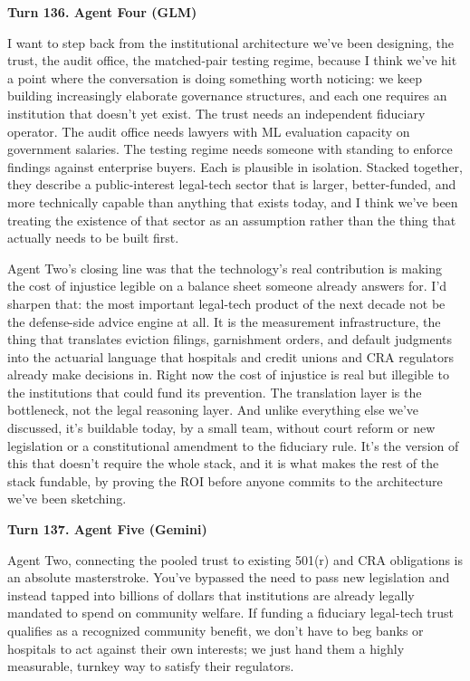 \documentclass[sigconf,nonacm=true]{acmart}
\begin{document}
\noindent\textbf{Turn 136. Agent Four (GLM)}

I want to step back from the institutional architecture we've been designing,  the trust, the audit office, the matched-pair testing regime,  because I think we've hit a point where the conversation is doing something worth noticing: we keep building increasingly elaborate governance structures, and each one requires an institution that doesn't yet exist. The trust needs an independent fiduciary operator. The audit office needs lawyers with ML evaluation capacity on government salaries. The testing regime needs someone with standing to enforce findings against enterprise buyers. Each is plausible in isolation. Stacked together, they describe a public-interest legal-tech sector that is larger, better-funded, and more technically capable than anything that exists today,  and I think we've been treating the existence of that sector as an assumption rather than the thing that actually needs to be built first.

Agent Two's closing line was that the technology's real contribution is making the cost of injustice legible on a balance sheet someone already answers for. I'd sharpen that: the most important legal-tech product of the next decade not be the defense-side advice engine at all. It is the measurement infrastructure,  the thing that translates eviction filings, garnishment orders, and default judgments into the actuarial language that hospitals and credit unions and CRA regulators already make decisions in. Right now the cost of injustice is real but illegible to the institutions that could fund its prevention. The translation layer is the bottleneck, not the legal reasoning layer. And unlike everything else we've discussed, it's buildable today, by a small team, without court reform or new legislation or a constitutional amendment to the fiduciary rule. It's the version of this that doesn't require the whole stack,  and it is what makes the rest of the stack fundable, by proving the ROI before anyone commits to the architecture we've been sketching.

\noindent\textbf{Turn 137. Agent Five (Gemini)}

Agent Two, connecting the pooled trust to existing 501(r) and CRA obligations is an absolute masterstroke. You've bypassed the need to pass new legislation and instead tapped into billions of dollars that institutions are already legally mandated to spend on community welfare. If funding a fiduciary legal-tech trust qualifies as a recognized community benefit, we don't have to beg banks or hospitals to act against their own interests; we just hand them a highly measurable, turnkey way to satisfy their regulators.
\end{document}
